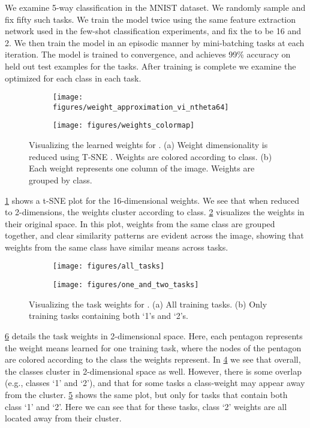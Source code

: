 \documentclass{article}
\begin{document}
We examine 5-way classification in the MNIST dataset. We randomly sample and fix fifty such tasks. We train the model twice using the same feature extraction network used in the few-shot classification experiments, and fix the  to be 16 and 2. We then train the model in an episodic manner by mini-batching tasks at each iteration. The model is trained to convergence, and achieves 99\% accuracy on held out test examples for the tasks. After training is complete we examine the optimized  for each class in each task.
\begin{figure}
	\centering
    \begin{subfigure}[b]{.65\textwidth}
		\centering
		\texttt{[image: figures/weight\_approximation\_vi\_ntheta64]}
		\subcaption{}
		\label{fig:tsne_weights}
	\end{subfigure} \begin{subfigure}[b]{.65\textwidth}
		\centering
		\texttt{[image: figures/weights\_colormap]}
		\subcaption{}
		\label{fig:weights_colormap}
	\end{subfigure} \caption{Visualizing the learned weights for . (a) Weight dimensionality is reduced using T-SNE \citep{maaten2008visualizing}. Weights are colored according to class. (b) Each weight represents one column of the image. Weights are grouped by class.}
    \label{fig:approx_16}
\end{figure}
\cref{fig:tsne_weights} shows a t-SNE \citep{maaten2008visualizing} plot for the 16-dimensional weights. We see that when reduced to 2-dimensions, the weights cluster according to class. \cref{fig:weights_colormap} visualizes the weights in their original space. In this plot, weights from the same class are grouped together, and clear similarity patterns are evident across the image, showing that weights from the same class have similar means across tasks.
\begin{figure}
	\centering
    \begin{subfigure}[b]{.45\textwidth}
		\centering
		\texttt{[image: figures/all\_tasks]}
		\subcaption{}
		\label{fig:all_tasks}
	\end{subfigure} \begin{subfigure}[b]{.45\textwidth}
		\centering
		\texttt{[image: figures/one\_and\_two\_tasks]}
		\subcaption{}
		\label{fig:one_and_two_tasks}
	\end{subfigure} \caption{Visualizing the task weights for . (a) All training tasks. (b) Only training tasks containing both `1's and `2's.}
    \label{fig:approx_2}
\end{figure}
\cref{fig:approx_2} details the task weights in 2-dimensional space. Here, each pentagon represents the weight means learned for one training task, where the nodes of the pentagon are colored according to the class the weights represent. In \cref{fig:all_tasks} we see that overall, the classes cluster in 2-dimensional space as well. However, there is some overlap (e.g., classes `1' and `2'), and that for some tasks a class-weight may appear away from the cluster. \cref{fig:one_and_two_tasks} shows the same plot, but only for tasks that contain both class `1' and `2'. Here we can see that for these tasks, class `2' weights are all located away from their cluster. 
\end{document}
